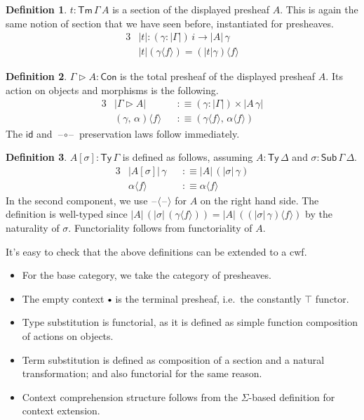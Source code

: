 \documentclass[12pt,a4paper,twoside,openany]{book}
\theoremstyle{remark}
\theoremstyle{definition}
\newtheorem{mydefinition}{Definition}
\newcommand{\id}{\mathsf{id}}
\newcommand{\Con}{\mathsf{Con}}
\newcommand{\Sub}{\mathsf{Sub}}
\newcommand{\Tm}{\mathsf{Tm}}
\newcommand{\Ty}{\mathsf{Ty}}
\newcommand{\blank}{\mathord{\hspace{1pt}\text{--}\hspace{1pt}}}
\newcommand{\ext}{\triangleright}
\newcommand{\emptycon}{\scaleobj{.75}\bullet}
\newcommand{\lab}{\langle}
\newcommand{\rab}{\rangle}
\newcommand{\defn}{:\equiv}
\begin{document}
\begin{mydefinition}
$t : \Tm\,\Gamma\,A$ is a section of the displayed presheaf $A$. This is
again the same notion of section that we have seen before, instantiated for
presheaves.
\begin{alignat*}{3}
  & |t| : (\gamma : |\Gamma|)\,i \to |A|\,\gamma \\
  & |t|(\gamma\lab f \rab) = (|t|\gamma)\lab f \rab
\end{alignat*}
\end{mydefinition}

\begin{mydefinition}
$\Gamma \ext A : \Con$ is the total presheaf of the displayed presheaf $A$. Its action on objects and morphisms is the following.
\begin{alignat*}{3}
  &|\Gamma \ext A| &&\defn (\gamma : |\Gamma|) \times |A\,\gamma|\\
  &(\gamma,\,\alpha)\lab f \rab &&\defn (\gamma\lab f \rab,\, \alpha\lab f \rab)
\end{alignat*}
The $\id$ and $\blank\!\circ\!\blank$ preservation laws follow immediately.
\end{mydefinition}

\begin{mydefinition}
$A[\sigma] : \Ty\,\Gamma$ is defined as follows, assuming
$A : \Ty\,\Delta$ and $\sigma : \Sub\,\Gamma\,\Delta$.
\begin{alignat*}{3}
  & |A[\sigma]|\,\gamma &&\defn |A|\,(|\sigma|\,\gamma) \\
  & \alpha \lab f \rab &&\defn \alpha \lab f \rab
\end{alignat*}
In the second component, we use $\blank\!\lab\!\blank\!\rab$ for $A$ on the right hand
side.  The definition is well-typed since $|A|\,(|\sigma|\,(\gamma\lab f \rab))
= |A|\,((|\sigma|\,\gamma)\lab f \rab)$ by the naturality of
$\sigma$. Functoriality follows from functoriality of $A$.
\end{mydefinition}

It's easy to check that the above definitions can be extended to a cwf.
\begin{itemize}
  \item For the base category, we take the category of presheaves.
  \item The empty context $\emptycon$ is the terminal presheaf, i.e.\ the
        constantly $\top$ functor.
  \item Type substitution is functorial, as it is defined as simple function
    composition of actions on objects.
  \item Term substitution is defined as composition of a section and
    a natural transformation; and also functorial for the same reason.
  \item Context comprehension structure follows from the $\Sigma$-based definition for
    context extension.
\end{itemize}
\end{document}
